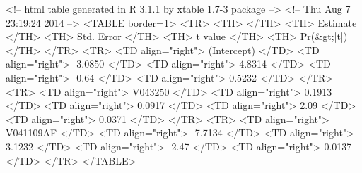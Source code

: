 \begin{Schunk}
\begin{Soutput}
<!-- html table generated in R 3.1.1 by xtable 1.7-3 package -->
<!-- Thu Aug  7 23:19:24 2014 -->
<TABLE border=1>
<TR> <TH>  </TH> <TH> Estimate </TH> <TH> Std. Error </TH> <TH> t value </TH> <TH> Pr(&gt;|t|) </TH>  </TR>
  <TR> <TD align="right"> (Intercept) </TD> <TD align="right"> -3.0850 </TD> <TD align="right"> 4.8314 </TD> <TD align="right"> -0.64 </TD> <TD align="right"> 0.5232 </TD> </TR>
  <TR> <TD align="right"> V043250 </TD> <TD align="right"> 0.1913 </TD> <TD align="right"> 0.0917 </TD> <TD align="right"> 2.09 </TD> <TD align="right"> 0.0371 </TD> </TR>
  <TR> <TD align="right"> V041109AF </TD> <TD align="right"> -7.7134 </TD> <TD align="right"> 3.1232 </TD> <TD align="right"> -2.47 </TD> <TD align="right"> 0.0137 </TD> </TR>
   </TABLE>
\end{Soutput}
\end{Schunk}
